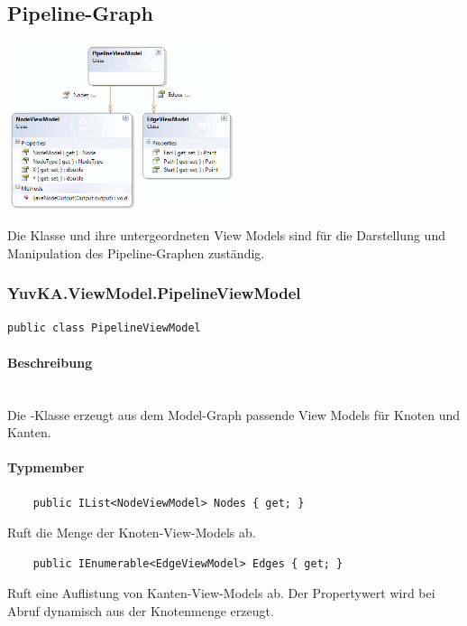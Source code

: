 \subsection{Pipeline-Graph}

\begin{center}	
\includegraphics[width=0.5\textwidth]{YuvKA.ViewModel/pipeline.png}
\end{center}
Die Klasse  und ihre untergeordneten View Models sind für die Darstellung und Manipulation des Pipeline-Graphen zuständig.

\subsubsection{YuvKA.ViewModel.PipelineViewModel}

\begin{verbatim}
public class PipelineViewModel
\end{verbatim}

\paragraph{Beschreibung}~\\
Die -Klasse erzeugt aus dem Model-Graph passende View Models für Knoten und Kanten.

\paragraph{Typmember}
\begin{itemize}

	\begin{verbatim}
	public IList<NodeViewModel> Nodes { get; }
	\end{verbatim}
	Ruft die Menge der Knoten-View-Models ab.

	\begin{verbatim}
	public IEnumerable<EdgeViewModel> Edges { get; }
	\end{verbatim}
	Ruft eine Auflistung von Kanten-View-Models ab. Der Propertywert wird bei Abruf dynamisch aus der Knotenmenge erzeugt.

\end{itemize}

